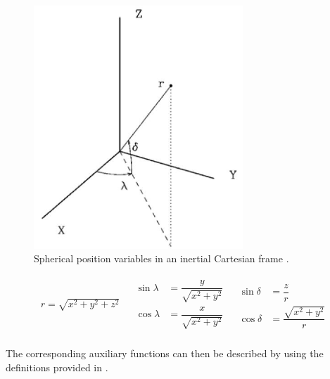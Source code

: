  \begin{figure}[!ht]
\centering
\includegraphics[width=0.7\textwidth]{figures/reference_frames/sphertocart_noomen2013basic.jpg}
\caption{Spherical position variables in an inertial Cartesian frame \citep{noomen2013basic}.}
\label{fig:sphertocart_noomen2013basic}
\end{figure}

\begin{align} \label{eq:transAngl}
\begin{split}
r = \sqrt{x^{2}+y^{2}+z^{2}}\\
\end{split}
&
\begin{split}
\sin \lambda &= \dfrac{y}{\sqrt{x^{2}+y^{2}}}\\
\cos \lambda &= \dfrac{x}{\sqrt{x^{2}+y^{2}}}\\
\end{split}
&
\begin{split}
\sin \delta &= \dfrac{z}{r}\\
\cos \delta &= \dfrac{\sqrt{x^{2}+y^{2}}}{r}
\end{split} 
\end{align} 

The corresponding auxiliary functions can then be described by  using the definitions provided in .

